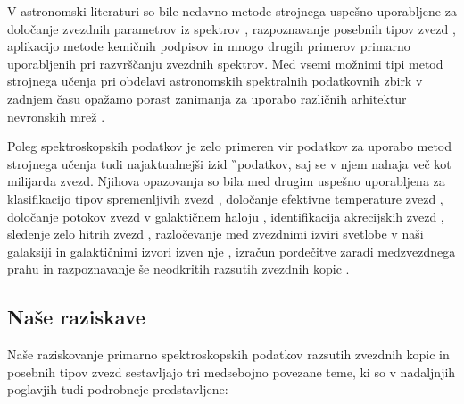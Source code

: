V astronomski literaturi so bile nedavno metode strojnega uspešno uporabljene za določanje zvezdnih parametrov iz spektrov \cite{2015ApJ...808...16N, buder2018, 2019ApJ...879...69T}, razpoznavanje posebnih tipov zvezd \cite{2017ApJS..228...24T}, aplikacijo metode kemičnih podpisov \cite{2015A&A...577A..47B, 2016ApJ...833..262H,2018MNRAS.473.4612K, 2018A&A...619A.125A, 2017MNRAS.467.1140J, 2018A&A...618A..65B} in mnogo drugih primerov primarno uporabljenih pri razvrščanju zvezdnih spektrov. Med vsemi možnimi tipi metod strojnega učenja pri obdelavi astronomskih spektralnih podatkovnih zbirk v zadnjem času opažamo porast zanimanja za uporabo različnih arhitektur nevronskih mrež \cite{2015MNRAS.452..158Y, 2019MNRAS.483.3255L, 2020ApJ...891...23W, 2020arXiv200208390O}.

Poleg spektroskopskih podatkov je zelo primeren vir podatkov za uporabo metod strojnega učenja tudi najaktualnejši izid \G\ podatkov, saj se v njem nahaja več kot milijarda zvezd. Njihova opazovanja so bila med drugim uspešno uporabljena za klasifikacijo tipov spremenljivih zvezd \cite{2020MNRAS.493.2981B}, določanje efektivne temperature zvezd \cite{2019AJ....158...93B}, določanje potokov zvezd v galaktičnem haloju \cite{2017A&A...598A..58H, 2020MNRAS.492.1370B}, identifikacija akrecijskih zvezd \cite{2019arXiv190706652O, 2019arXiv190707681N}, sledenje zelo hitrih zvezd \cite{2017MNRAS.470.1388M}, razločevanje med zvezdnimi izviri svetlobe v naši galaksiji in galaktičnimi izvori izven nje \cite{2018RAA....18..118B, 2019MNRAS.490.5615B}, izračun pordečitve zaradi medzvezdnega prahu \cite{2020AJ....159...84B} in razpoznavanje še neodkritih razsutih zvezdnih kopic \cite{2020A&A...635A..45C}.

\subsection{Naše raziskave}
\label{sec:slo_raziskave}
Naše raziskovanje primarno spektroskopskih podatkov razsutih zvezdnih kopic in posebnih tipov zvezd sestavljajo tri medsebojno povezane teme, ki so v nadaljnjih poglavjih tudi podrobneje predstavljene:

